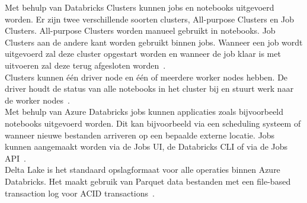 
Met behulp van Databricks Clusters kunnen jobs en notebooks uitgevoerd worden. Er zijn twee verschillende soorten clusters, All-purpose Clusters en Job Clusters. All-purpose Clusters worden manueel gebruikt in notebooks. Job Clusters aan de andere kant worden gebruikt binnen jobs. Wanneer een job wordt uitgevoerd zal deze cluster opgestart worden en wanneer de job klaar is met uitvoeren zal deze terug afgesloten worden~\autocite{Samuel2021}.\\

Clusters kunnen één driver node en één of meerdere worker nodes hebben. De driver houdt de status van alle notebooks in het cluster bij en stuurt werk naar de worker nodes~\autocite{Samuel2021}.\\


Met behulp van Azure Databricks jobs kunnen applicaties zoals bijvoorbeeld notebooks uitgevoerd worden. Dit kan bijvoorbeeld via een scheduling systeem of wanneer nieuwe bestanden arriveren op een bepaalde externe locatie. Jobs kunnen aangemaakt worden via de Jobs UI, de Databricks CLI of via de Jobs API~\autocite{Microsoft2024h}.\\

%




Delta Lake is het standaard opslagformaat voor alle operaties binnen Azure Databricks. Het maakt gebruik van Parquet data bestanden met een file-based transaction log voor ACID transactions~\autocite{Microsoft2024c}.

%

